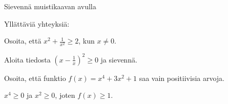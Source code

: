 \begin{tehtavasivu}
\newpage

\begin{tehtava}
Sievennä muistikaavan avulla
    \begin{alakohdat}
    \end{alakohdat}
    \begin{vastaus}
        \begin{alakohdat}
         \end{alakohdat}
    \end{vastaus}
\end{tehtava}

\begin{tehtava} %
	Yllättäviä yhteyksiä:
    \begin{alakohdat}
    \end{alakohdat}

    \begin{vastaus}
    \begin{alakohdat}
    \end{alakohdat}
    \end{vastaus}
\end{tehtava}

\begin{tehtava} %
Osoita, että $x^2+\frac{1}{x^2}\geq 2$, kun $x \neq 0$.
    \begin{vastaus}
     Aloita tiedosta $\left(x-\frac{1}{x}\right)^2 \geq 0$ ja sievennä.
    \end{vastaus}
\end{tehtava}

\begin{tehtava} %
Osoita, että funktio $f(x)=x^4+3x^2+1$ saa vain positiivisia arvoja.
    \begin{vastaus}
     $x^4\geq 0$ ja $x^2 \geq 0$, joten $f(x) \geq 1$.
    \end{vastaus}
\end{tehtava}


\end{tehtavasivu}
